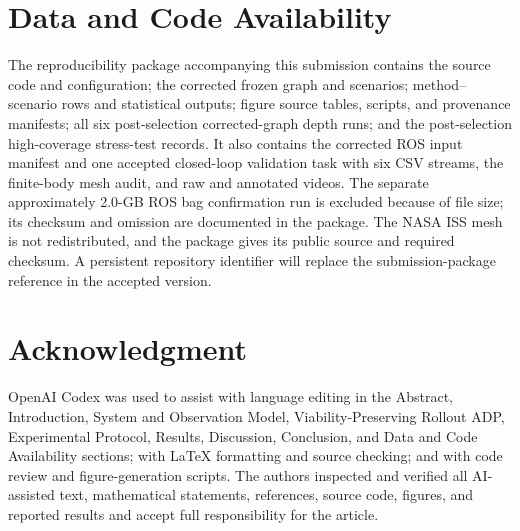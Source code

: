 \documentclass{IEEEtaes}
\theoremstyle{remark}
\theoremstyle{plain}
\begin{document}
\section*{Data and Code Availability}
The reproducibility package accompanying this submission contains the source code and configuration; the corrected frozen graph and scenarios; method--scenario rows and statistical outputs; figure source tables, scripts, and provenance manifests; all six post-selection corrected-graph depth runs; and the post-selection high-coverage stress-test records. It also contains the corrected ROS input manifest and one accepted closed-loop validation task with six CSV streams, the finite-body mesh audit, and raw and annotated videos. The separate approximately 2.0-GB ROS bag confirmation run is excluded because of file size; its checksum and omission are documented in the package. The NASA ISS mesh is not redistributed, and the package gives its public source and required checksum. A persistent repository identifier will replace the submission-package reference in the accepted version.

\section*{Acknowledgment}
OpenAI Codex was used to assist with language editing in the Abstract, Introduction, System and Observation Model, Viability-Preserving Rollout ADP, Experimental Protocol, Results, Discussion, Conclusion, and Data and Code Availability sections; with LaTeX formatting and source checking; and with code review and figure-generation scripts. The authors inspected and verified all AI-assisted text, mathematical statements, references, source code, figures, and reported results and accept full responsibility for the article.




\end{document}
